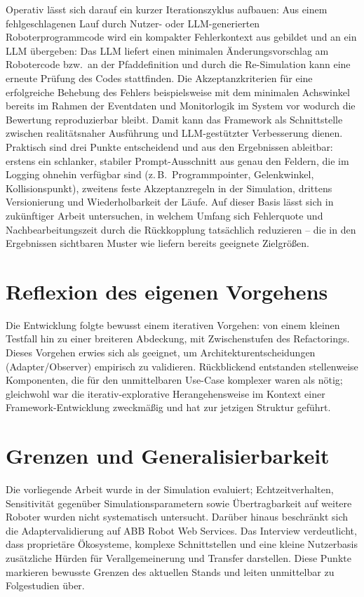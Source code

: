 Operativ lässt sich darauf ein kurzer Iterationszyklus aufbauen: Aus
einem fehlgeschlagenen Lauf durch Nutzer- oder LLM-generierten
Roboterprogrammcode wird ein kompakter Fehlerkontext aus
gebildet und an ein LLM übergeben: Das
LLM liefert einen minimalen Änderungsvorschlag am Robotercode
bzw.\ an der Pfaddefinition und durch die Re-Simulation kann eine erneute
Prüfung des Codes stattfinden. Die Akzeptanzkriterien für eine erfolgreiche
Behebung des Fehlers beispielsweise mit dem minimalen Achswinkel bereits
im Rahmen der Eventdaten und Monitorlogik im System vor wodurch die
Bewertung reproduzierbar bleibt.
Damit kann das Framework als
Schnittstelle zwischen realitätsnaher Ausführung und
LLM-gestützter Verbesserung dienen. Praktisch sind drei Punkte entscheidend
und aus den Ergebnissen ableitbar: erstens ein schlanker, stabiler
Prompt-Ausschnitt aus genau den Feldern, die im Logging ohnehin
verfügbar sind (z.\,B.\ Programmpointer, Gelenkwinkel,
Kollisionspunkt), zweitens feste Akzeptanzregeln in der Simulation,
drittens Versionierung und Wiederholbarkeit der Läufe. Auf dieser
Basis lässt sich in zukünftiger Arbeit untersuchen, in welchem Umfang
sich Fehlerquote und Nachbearbeitungszeit durch die Rückkopplung
tatsächlich reduzieren – die in den Ergebnissen sichtbaren Muster wie
liefern bereits geeignete Zielgrößen.

\section{Reflexion des eigenen Vorgehens}

Die Entwicklung folgte bewusst einem iterativen Vorgehen: von einem kleinen
Testfall hin zu einer breiteren Abdeckung, mit Zwischenstufen des Refactorings.
Dieses Vorgehen erwies sich als geeignet, um Architekturentscheidungen
(Adapter/Observer) empirisch zu validieren. Rückblickend entstanden stellenweise
Komponenten, die für den unmittelbaren Use-Case komplexer waren als nötig;
gleichwohl war die iterativ-explorative Herangehensweise im Kontext einer
Framework-Entwicklung zweckmäßig und hat zur jetzigen Struktur geführt.

\section{Grenzen und Generalisierbarkeit}

Die vorliegende Arbeit wurde in der Simulation evaluiert; Echtzeitverhalten,
Sensitivität gegenüber Simulationsparametern sowie Übertragbarkeit auf weitere
Roboter wurden nicht systematisch untersucht. Darüber hinaus beschränkt sich die
Adaptervalidierung auf ABB Robot Web Services. Das Interview verdeutlicht, dass
proprietäre Ökosysteme, komplexe Schnittstellen und eine kleine Nutzerbasis
zusätzliche Hürden für Verallgemeinerung und Transfer darstellen. Diese Punkte
markieren bewusste Grenzen des aktuellen Stands und leiten unmittelbar zu
Folgestudien über.
